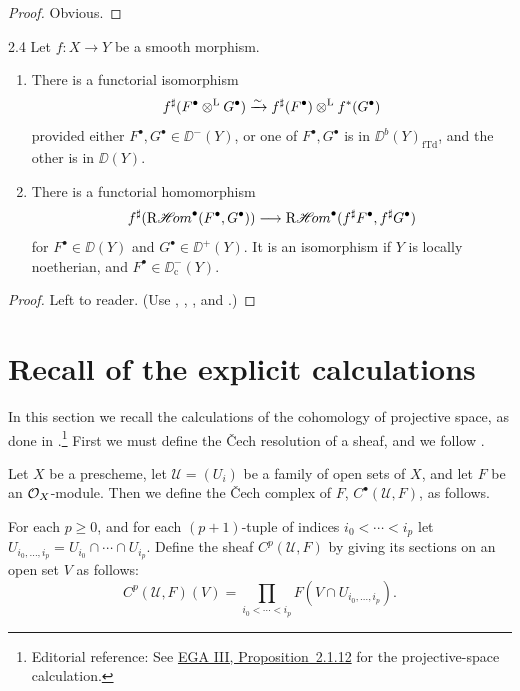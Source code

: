 \begin{proof}
Obvious.
\end{proof}

\begin{bookproposition}{2.4}\label{prop:3.2.4}
Let $f\colon X\to Y$ be a smooth morphism.
\begin{enumerate}
\item[a)] There is a functorial isomorphism
\[
f^{\sharp}(F^\bullet\mathbin{\otimes^{\mathrm{L}}} G^\bullet) \xrightarrow{\sim} f^{\sharp}(F^\bullet)\mathbin{\otimes^{\mathrm{L}}}  f^*(G^\bullet)
\]
provided either $F^\bullet,G^\bullet\in\DD^-(Y)$, or one of $F^\bullet,G^\bullet$ is in $\DD^b(Y)_{\mathrm{fTd}}$, and the other is in $\DD(Y)$.
\item[b)] There is a functorial homomorphism
\[
f^{\sharp}(\mathop{\mathrm{R}\mathscr{H}\!om}\nolimits^\bullet(F^\bullet,G^\bullet)) \longrightarrow \mathop{\mathrm{R}\mathscr{H}\!om}\nolimits^\bullet(f^{\sharp}F^\bullet, f^{\sharp}G^\bullet)
\]
for $F^\bullet\in\DD(Y)$ and $G^\bullet\in\DD^+(Y)$. It is an isomorphism if $Y$ is locally noetherian, and $F^\bullet\in\DD_{\mathrm{c}}^-(Y)$.
\end{enumerate}
\end{bookproposition}

\begin{proof}
Left to reader. (Use , , , and .)
\end{proof}

\section{Recall of the explicit calculations}\label{sec:3.3}

In this section we recall the calculations of the cohomology of projective space, as done in \cite[\nopp III,~\S1]{EGA}.\footnote{Editorial reference: See \href{https://www.numdam.org/item/PMIHES_1961__11__5_0.pdf\#page=95}{EGA III, Proposition~2.1.12} for the projective-space calculation.} First we must define the \v{C}ech resolution of a sheaf, and we follow \cite[\nopp II,~\S5]{G}.

Let $X$ be a prescheme, let $\mathcal{U}=(U_i)$ be a family of open sets of $X$, and let $F$ be an $\mathcal{O}_X$-module. Then we define the \v{C}ech complex of $F$, $C^\bullet(\mathcal{U},F)$, as follows.

For each $p\ge 0$, and for each $(p+1)$-tuple of indices $i_0<\cdots<i_p$ let $U_{i_0,\dots,i_p}=U_{i_0}\cap\cdots\cap U_{i_p}$. Define the sheaf $C^p(\mathcal{U},F)$ by giving its sections on an open set $V$ as follows:
\[
C^p(\mathcal{U},F)(V) = \prod_{i_0<\cdots<i_p} F(V\cap U_{i_0,\dots,i_p}).
\]

